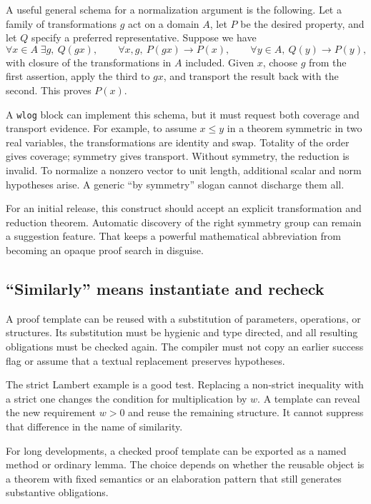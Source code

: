 \documentclass[11pt,a4paper]{article}
\newcommand{\codeid}[1]{\nolinkurl{#1}}
\begin{document}
A useful general schema for a normalization argument is the following. Let a family of transformations $g$ act on a domain $A$, let $P$ be the desired property, and let $Q$ specify a preferred representative. Suppose we have
\[
 \forall x\in A\;\exists g,\ Q(gx),
 \qquad
 \forall x,g,\ P(gx)\to P(x),
 \qquad
 \forall y\in A,\ Q(y)\to P(y),
\]
with closure of the transformations in $A$ included. Given $x$, choose $g$ from the first assertion, apply the third to $gx$, and transport the result back with the second. This proves $P(x)$.

A \codeid{wlog} block can implement this schema, but it must request both coverage and transport evidence. For example, to assume $x\le y$ in a theorem symmetric in two real variables, the transformations are identity and swap. Totality of the order gives coverage; symmetry gives transport. Without symmetry, the reduction is invalid. To normalize a nonzero vector to unit length, additional scalar and norm hypotheses arise. A generic ``by symmetry'' slogan cannot discharge them all.

For an initial release, this construct should accept an explicit transformation and reduction theorem. Automatic discovery of the right symmetry group can remain a suggestion feature. That keeps a powerful mathematical abbreviation from becoming an opaque proof search in disguise.

\subsection{``Similarly'' means instantiate and recheck}

A proof template can be reused with a substitution of parameters, operations, or structures. Its substitution must be hygienic and type directed, and all resulting obligations must be checked again. The compiler must not copy an earlier success flag or assume that a textual replacement preserves hypotheses.

The strict Lambert example is a good test. Replacing a non-strict inequality with a strict one changes the condition for multiplication by $w$. A template can reveal the new requirement $w>0$ and reuse the remaining structure. It cannot suppress that difference in the name of similarity.

For long developments, a checked proof template can be exported as a named method or ordinary lemma. The choice depends on whether the reusable object is a theorem with fixed semantics or an elaboration pattern that still generates substantive obligations.
\end{document}
